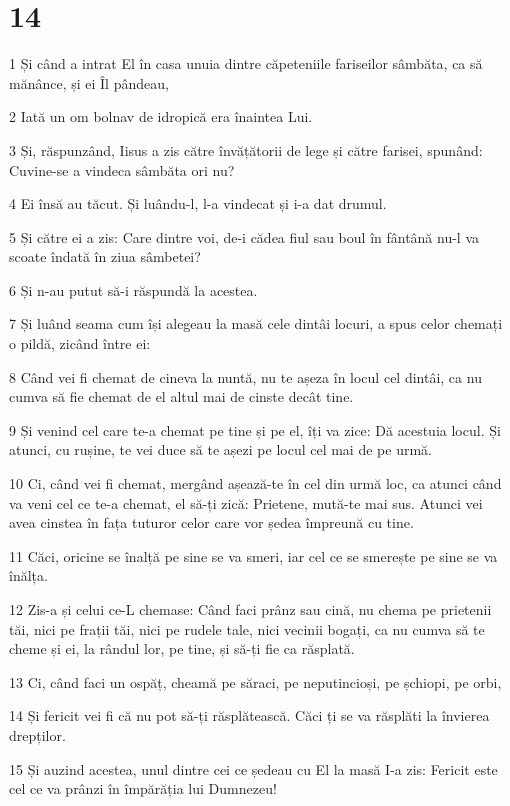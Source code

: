 \chapter{14}

\par 1 Și când a intrat El în casa unuia dintre căpeteniile fariseilor sâmbăta, ca să mănânce, și ei Îl pândeau,
\par 2 Iată un om bolnav de idropică era înaintea Lui.
\par 3 Și, răspunzând, Iisus a zis către învățătorii de lege și către farisei, spunând: Cuvine-se a vindeca sâmbăta ori nu?
\par 4 Ei însă au tăcut. Și luându-l, l-a vindecat și i-a dat drumul.
\par 5 Și către ei a zis: Care dintre voi, de-i cădea fiul sau boul în fântână nu-l va scoate îndată în ziua sâmbetei?
\par 6 Și n-au putut să-i răspundă la acestea.
\par 7 Și luând seama cum își alegeau la masă cele dintâi locuri, a spus celor chemați o pildă, zicând între ei:
\par 8 Când vei fi chemat de cineva la nuntă, nu te așeza în locul cel dintâi, ca nu cumva să fie chemat de el altul mai de cinste decât tine.
\par 9 Și venind cel care te-a chemat pe tine și pe el, îți va zice: Dă acestuia locul. Și atunci, cu rușine, te vei duce să te așezi pe locul cel mai de pe urmă.
\par 10 Ci, când vei fi chemat, mergând așează-te în cel din urmă loc, ca atunci când va veni cel ce te-a chemat, el să-ți zică: Prietene, mută-te mai sus. Atunci vei avea cinstea în fața tuturor celor care vor ședea împreună cu tine.
\par 11 Căci, oricine se înalță pe sine se va smeri, iar cel ce se smerește pe sine se va înălța.
\par 12 Zis-a și celui ce-L chemase: Când faci prânz sau cină, nu chema pe prietenii tăi, nici pe frații tăi, nici pe rudele tale, nici vecinii bogați, ca nu cumva să te cheme și ei, la rândul lor, pe tine, și să-ți fie ca răsplată.
\par 13 Ci, când faci un ospăț, cheamă pe săraci, pe neputincioși, pe șchiopi, pe orbi,
\par 14 Și fericit vei fi că nu pot să-ți răsplătească. Căci ți se va răsplăti la învierea drepților.
\par 15 Și auzind acestea, unul dintre cei ce ședeau cu El la masă I-a zis: Fericit este cel ce va prânzi în împărăția lui Dumnezeu!
